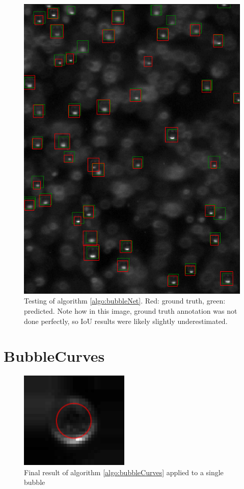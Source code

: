 			\begin{figure}[h!]
				\centering
				\includegraphics[scale=0.8]{images/bubbleNet_validation_result.png}
				\caption{Testing of algorithm \ref{algo:bubbleNet}. Red: ground truth, green: predicted. Note how in this image, ground truth annotation was not done perfectly, so IoU results were likely slightly underestimated.}
				\label{fig:bubbleNet_result}
			\end{figure}





			\section{BubbleCurves}\label{result_curves}
				\begin{figure}[h!]
					\centering
					\includegraphics[scale=1.3]{images/bubbleCurve_final_result.png}
					\caption{Final result of algorithm \ref{algo:bubbleCurves} applied to a single bubble}
					\label{fig:final_result}
				\end{figure}
				
